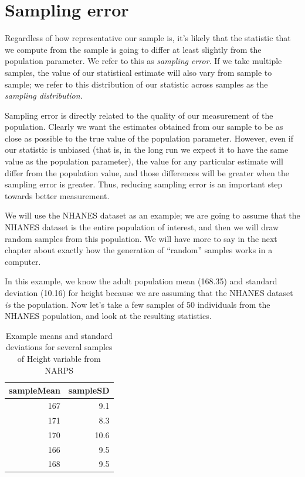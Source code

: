 \documentclass[12pt,]{book}
\theoremstyle{definition}
\theoremstyle{definition}
\theoremstyle{definition}
\theoremstyle{remark}
\begin{document}
\hypertarget{samplingerror}{%
\section{Sampling error}\label{samplingerror}}

Regardless of how representative our sample is, it's likely that the statistic that we compute from the sample is going to differ at least slightly from the population parameter. We refer to this as \emph{sampling error}. If we take multiple samples, the value of our statistical estimate will also vary from sample to sample; we refer to this distribution of our statistic across samples as the \emph{sampling distribution}.

Sampling error is directly related to the quality of our measurement of the population. Clearly we want the estimates obtained from our sample to be as close as possible to the true value of the population parameter. However, even if our statistic is unbiased (that is, in the long run we expect it to have the same value as the population parameter), the value for any particular estimate will differ from the population value, and those differences will be greater when the sampling error is greater. Thus, reducing sampling error is an important step towards better measurement.

We will use the NHANES dataset as an example; we are going to assume that the NHANES dataset is the entire population of interest, and then we will draw random samples from this population. We will have more to say in the next chapter about exactly how the generation of ``random'' samples works in a computer.

In this example, we know the adult population mean (168.35) and standard deviation (10.16) for height because we are assuming that the NHANES dataset \emph{is} the population. Now let's take a few samples of 50 individuals from the NHANES population, and look at the resulting statistics.

\begin{table}

\caption{\label{tab:unnamed-chunk-35}Example means and standard deviations for several samples of Height variable from NARPS}
\centering
\begin{tabular}[t]{r|r}
\hline
sampleMean & sampleSD\\
\hline
167 & 9.1\\
\hline
171 & 8.3\\
\hline
170 & 10.6\\
\hline
166 & 9.5\\
\hline
168 & 9.5\\
\hline
\end{tabular}
\end{table}
\end{document}
